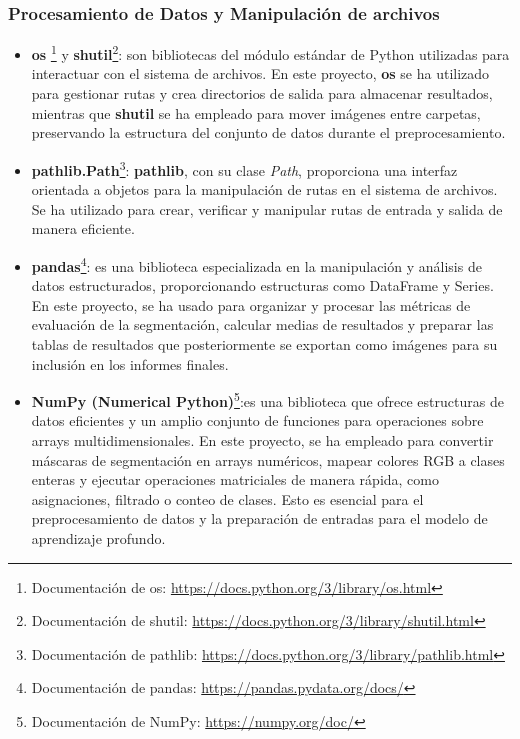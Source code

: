 \subsubsection{Procesamiento de Datos y Manipulación de archivos}
\begin{itemize}
    \item \textbf{os} \footnote{Documentación de os: \url{https://docs.python.org/3/library/os.html}} y \textbf{shutil}\footnote{Documentación de shutil: \url{https://docs.python.org/3/library/shutil.html}}: son bibliotecas del módulo estándar de Python utilizadas para interactuar con el sistema de archivos. En este proyecto, \textbf{os} se ha utilizado para gestionar rutas y crea directorios de salida para almacenar resultados, mientras que \textbf{shutil} se ha empleado para mover imágenes entre carpetas, preservando la estructura del conjunto de datos durante el preprocesamiento.
    \item \textbf{pathlib.Path}\footnote{Documentación de pathlib: \url{https://docs.python.org/3/library/pathlib.html}}: \textbf{pathlib}, con su clase \textit{Path}, proporciona una interfaz orientada a objetos para la manipulación de rutas en el sistema de archivos. Se ha utilizado para crear, verificar y manipular rutas de entrada y salida de manera eficiente.
    \item \textbf{pandas}\footnote{Documentación de pandas: \url{https://pandas.pydata.org/docs/}}: es una biblioteca especializada en la manipulación y análisis de datos estructurados, proporcionando estructuras como DataFrame y Series. En este proyecto, se ha usado para organizar y procesar las métricas de evaluación de la segmentación, calcular medias de resultados y preparar las tablas de resultados que posteriormente se exportan como imágenes para su inclusión en los informes finales.
    \item \textbf{NumPy (Numerical Python)}\footnote{Documentación de NumPy: \url{https://numpy.org/doc/}}:es una biblioteca que ofrece estructuras de datos eficientes y un amplio conjunto de funciones para operaciones sobre arrays multidimensionales. En este proyecto, se ha empleado para convertir máscaras de segmentación en arrays numéricos, mapear colores RGB a clases enteras y ejecutar operaciones matriciales de manera rápida, como asignaciones, filtrado o conteo de clases. Esto es esencial para el preprocesamiento de datos y la preparación de entradas para el modelo de aprendizaje profundo.
\end{itemize}
